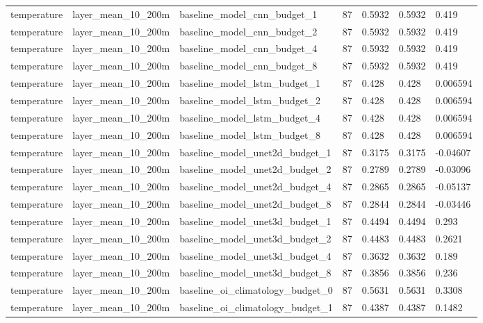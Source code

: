 \begin{table}[htbp]
\begin{tabular}{lllllll}
temperature & layer\_mean\_10\_200m & baseline\_model\_cnn\_budget\_1 & 87 & 0.5932 & 0.5932 & 0.419 \\
temperature & layer\_mean\_10\_200m & baseline\_model\_cnn\_budget\_2 & 87 & 0.5932 & 0.5932 & 0.419 \\
temperature & layer\_mean\_10\_200m & baseline\_model\_cnn\_budget\_4 & 87 & 0.5932 & 0.5932 & 0.419 \\
temperature & layer\_mean\_10\_200m & baseline\_model\_cnn\_budget\_8 & 87 & 0.5932 & 0.5932 & 0.419 \\
temperature & layer\_mean\_10\_200m & baseline\_model\_lstm\_budget\_1 & 87 & 0.428 & 0.428 & 0.006594 \\
temperature & layer\_mean\_10\_200m & baseline\_model\_lstm\_budget\_2 & 87 & 0.428 & 0.428 & 0.006594 \\
temperature & layer\_mean\_10\_200m & baseline\_model\_lstm\_budget\_4 & 87 & 0.428 & 0.428 & 0.006594 \\
temperature & layer\_mean\_10\_200m & baseline\_model\_lstm\_budget\_8 & 87 & 0.428 & 0.428 & 0.006594 \\
temperature & layer\_mean\_10\_200m & baseline\_model\_unet2d\_budget\_1 & 87 & 0.3175 & 0.3175 & -0.04607 \\
temperature & layer\_mean\_10\_200m & baseline\_model\_unet2d\_budget\_2 & 87 & 0.2789 & 0.2789 & -0.03096 \\
temperature & layer\_mean\_10\_200m & baseline\_model\_unet2d\_budget\_4 & 87 & 0.2865 & 0.2865 & -0.05137 \\
temperature & layer\_mean\_10\_200m & baseline\_model\_unet2d\_budget\_8 & 87 & 0.2844 & 0.2844 & -0.03446 \\
temperature & layer\_mean\_10\_200m & baseline\_model\_unet3d\_budget\_1 & 87 & 0.4494 & 0.4494 & 0.293 \\
temperature & layer\_mean\_10\_200m & baseline\_model\_unet3d\_budget\_2 & 87 & 0.4483 & 0.4483 & 0.2621 \\
temperature & layer\_mean\_10\_200m & baseline\_model\_unet3d\_budget\_4 & 87 & 0.3632 & 0.3632 & 0.189 \\
temperature & layer\_mean\_10\_200m & baseline\_model\_unet3d\_budget\_8 & 87 & 0.3856 & 0.3856 & 0.236 \\
temperature & layer\_mean\_10\_200m & baseline\_oi\_climatology\_budget\_0 & 87 & 0.5631 & 0.5631 & 0.3308 \\
temperature & layer\_mean\_10\_200m & baseline\_oi\_climatology\_budget\_1 & 87 & 0.4387 & 0.4387 & 0.1482 \\

\end{tabular}
\end{table}
